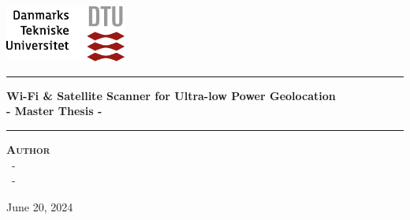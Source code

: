 \begin{titlepage}
\centering
\includegraphics[width=0.3\textwidth]{figures/root/dtu.png}
\vspace{3cm}


\hrule
\vspace{.5cm}
\huge{\textbf{Wi-Fi \& Satellite Scanner for Ultra-low Power Geolocation}} \\
\normalsize
\vspace{.5cm}
{ \Large \bfseries - Master Thesis -}
\vspace{.5cm}
\hrule
\vspace{2cm}

\textsc{\textbf{Author}}\\
\vspace{.5cm}
\centering
\authorNameA ~- \authorNumberA \\
\authorNameB ~- \authorNumberB

\vspace{1.5cm}
\centering

\vspace*{\fill} %
\centering June 20, 2024 %

\end{titlepage}

